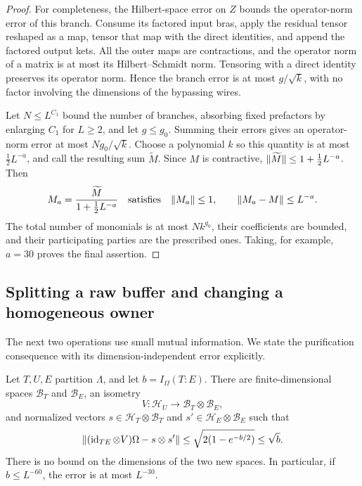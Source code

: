 \begin{proof}
For completeness, the Hilbert-space error on $Z$ bounds the operator-norm
error of this branch.  Consume its factored input bras, apply the residual
tensor reshaped as a map, tensor that map with the direct identities, and
append the factored output kets.  All the outer maps are contractions,
and the operator norm of a matrix is at most its Hilbert--Schmidt norm.
Tensoring with a direct identity preserves its operator norm.  Hence the
branch error is at most $g/\sqrt{k}$, with no factor involving the dimensions
of the bypassing wires.

Let $N\le L^{C_1}$ bound the number of branches, absorbing fixed prefactors
by enlarging $C_1$ for $L\ge2$, and let $g\le g_0$.  Summing their errors
gives an operator-norm error at most $Ng_0/\sqrt{k}$.  Choose a polynomial
$k$ so this quantity is at most $\tfrac12L^{-a}$, and call the resulting
sum $\widetilde M$.  Since $M$ is contractive,
$\lVert \widetilde M\rVert\le1+\tfrac12L^{-a}$.  Then
\[
 M_a=\frac{\widetilde M}{1+\tfrac12L^{-a}}
 \quad\hbox{satisfies}\quad
 \lVert M_a\rVert\le1,\qquad \lVert M_a-M\rVert\le L^{-a}.
\]
The total number of monomials is at most $Nk^{g_0}$, their coefficients are
bounded, and their participating parties are the prescribed ones.  Taking,
for example, $a=30$ proves the final assertion.
\end{proof}

\subsection{Splitting a raw buffer and changing a homogeneous owner}

The next two operations use small mutual information.  We state the
purification consequence with its dimension-independent error explicitly.

\begin{lemma}\label{lem:splitting}
Let $T,U,E$ partition $\Lambda$, and let
$b=I_\Omega(T:E)$.  There are finite-dimensional spaces $\mathcal B_T$ and
$\mathcal B_E$, an isometry
\[
 V:\mathcal H_U\longrightarrow\mathcal B_T\otimes\mathcal B_E,
\]
and normalized vectors
$s\in\mathcal H_T\otimes\mathcal B_T$ and
$s'\in\mathcal H_E\otimes\mathcal B_E$ such that
\begin{equation}\label{eq:frame-splitting}
 \lVert (\operatorname{id}_{TE}\otimes V)\Omega-s\otimes s'\rVert
       \le\sqrt{2(1-e^{-b/2})}\le\sqrt b.
\end{equation}
There is no bound on the dimensions of the two new spaces.  In particular,
if $b\le L^{-60}$, the error is at most $L^{-30}$.
\end{lemma}

